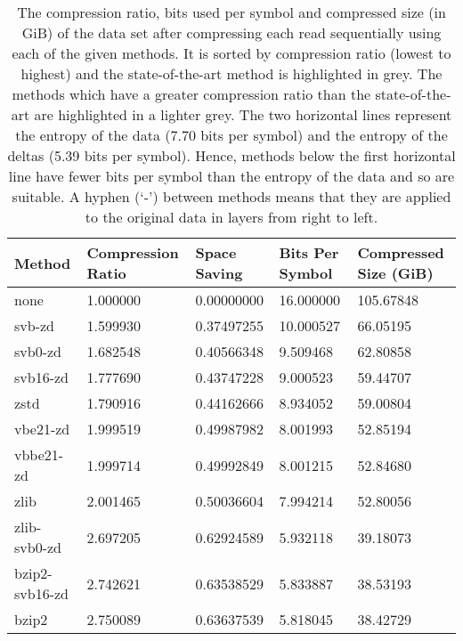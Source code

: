 \begin{table}
    \caption{\label{tab:results-space} The compression ratio, bits used per
	symbol and compressed size (in GiB) of the data set after compressing
	each read sequentially using each of the given methods. It is
	sorted by compression ratio (lowest to highest) and the state-of-the-art method is
	highlighted in grey.
	The methods which have a greater compression ratio than the
	state-of-the-art are highlighted in a lighter grey.
	The two horizontal lines represent the entropy of
	the data (7.70 bits per symbol) and the entropy of the deltas (5.39
	bits per symbol). Hence, methods below the first horizontal line have
	fewer bits per symbol than the entropy of the data and so are suitable.
	A hyphen (`-') between methods means that they are applied to the
	original data in layers from right to left.}
	\begin{tabular}{|l|l|l|l|l|}
	    \hline
		Method & Compression Ratio & Space Saving & Bits Per Symbol & Compressed Size (GiB) \\
\hline
               none    &1.000000  & 0.00000000 &16.000000 &105.67848\\
             svb-zd    &1.599930  & 0.37497255 &10.000527 & 66.05195\\
         svb0-zd    &1.682548  & 0.40566348 & 9.509468 & 62.80858\\
           svb16-zd    &1.777690  & 0.43747228 & 9.000523 & 59.44707\\
               zstd    &1.790916  & 0.44162666 & 8.934052 & 59.00804\\
           vbe21-zd    &1.999519  & 0.49987982 & 8.001993 & 52.85194\\
          vbbe21-zd    &1.999714  & 0.49992849 & 8.001215 & 52.84680\\
               zlib    &2.001465  & 0.50036604 & 7.994214 & 52.80056\\
	       \hline
    zlib-svb0-zd    &2.697205  & 0.62924589 & 5.932118 & 39.18073\\
     bzip2-svb16-zd    &2.742621  & 0.63538529 & 5.833887 & 38.53193\\
              bzip2    &2.750089  & 0.63637539 & 5.818045 & 38.42729\\

\end{tabular}
\end{table}
